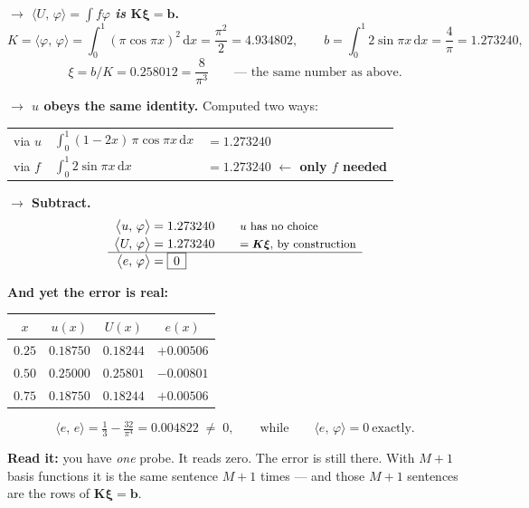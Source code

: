 \documentclass[11pt]{article}
\newcommand{\dx}{\,\mathrm{d}x}
\newcommand{\ip}[2]{\bigl\langle #1,\,#2\bigr\rangle}
\newcommand{\Kmat}{\bm{K}}
\begin{document}
\begin{worked}
\textbf{$\rightarrow$ $\ip{U}{\varphi}=\int f\varphi$ \emph{is} $\Kmat\bm{\xi}=\bm{b}$.}
\[
  K=\ip{\varphi}{\varphi}=\int_0^1(\pi\cos\pi x)^{2}\dx=\frac{\pi^{2}}{2}=4.934802,
  \qquad
  b=\int_0^1 2\sin\pi x\dx=\frac{4}{\pi}=1.273240,
\]
\[
  \xi=b/K=0.258012=\frac{8}{\pi^{3}}\qquad\text{--- the same number as above.}
\]

\textbf{$\rightarrow$ $u$ obeys the same identity.} Computed two ways:
\begin{center}\small
\begin{tabular}{@{}lll@{}}
\toprule
via $u$ & $\displaystyle\int_0^1(1-2x)\,\pi\cos\pi x\dx$ & $=1.273240$\\
via $f$ & $\displaystyle\int_0^1 2\sin\pi x\dx$          & $=1.273240$ \quad
  \textbf{$\leftarrow$ only $f$ needed}\\
\bottomrule
\end{tabular}
\end{center}

\textbf{$\rightarrow$ Subtract.}
\[
  \begin{array}{r@{\;=\;}l@{\qquad}l}
    \ip{u}{\varphi} & 1.273240 & \text{\small $u$ has no choice}\\[2pt]
    \ip{U}{\varphi} & 1.273240 & \text{\small $=\Kmat\bm{\xi}$, by construction}\\
    \hline
    \ip{e}{\varphi} & \boxed{\,0\,} &
  \end{array}
\]

\medskip
\textbf{And yet the error is real:}
\begin{center}\small
\begin{tabular}{@{}cccc@{}}
\toprule
$x$ & $u(x)$ & $U(x)$ & $e(x)$\\
\midrule
$0.25$ & $0.18750$ & $0.18244$ & $+0.00506$\\
$0.50$ & $0.25000$ & $0.25801$ & $-0.00801$\\
$0.75$ & $0.18750$ & $0.18244$ & $+0.00506$\\
\bottomrule
\end{tabular}
\end{center}
\[
  \ip{e}{e}=\tfrac13-\tfrac{32}{\pi^{4}}=0.004822\;\neq\;0,
  \qquad\text{while}\qquad \ip{e}{\varphi}=0\ \text{exactly.}
\]

\textbf{Read it:} you have \emph{one} probe. It reads zero. The error is still
there. With $M+1$ basis functions it is the same sentence $M+1$ times --- and
those $M+1$ sentences are the rows of $\Kmat\bm{\xi}=\bm{b}$.
\end{worked}
\end{document}
